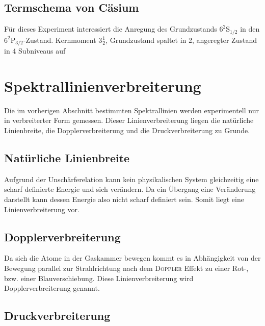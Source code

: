 \documentclass[../bericht.tex]{subfiles}
\begin{document}
      \subsection{Termschema von Cäsium}
      \label{subsec:termschema-caesium}

        Für dieses Experiment interessiert die Anregung des Grundzustands $6^2\mathrm{S}_{1/2}$ in den $6^2\mathrm{P}_{3/2}$-Zustand.
        Kernmoment $3 \frac{1}{2}$, Grundzustand spaltet in 2, angeregter Zustand in 4 Subniveaus auf




    \section{Spektrallinienverbreiterung}
    \label{sec:linienverbreiterung}

      Die im vorherigen Abschnitt bestimmten Spektrallinien werden experimentell nur in verbreiterter Form gemessen. Dieser Linienverbreiterung liegen die natürliche Linienbreite, die Dopplerverbreiterung und die Druckverbreiterung zu Grunde.

      \subsection{Natürliche Linienbreite}
      \label{subsec:natuerliche-linienbreite}

        Aufgrund der Unschärferelation kann kein physikalischen System gleichzeitig eine scharf definierte Energie und sich verändern. Da ein Übergang eine Veränderung darstellt kann dessen Energie also nicht scharf definiert sein. Somit liegt eine Linienverbreiterung vor.


      \subsection{Dopplerverbreiterung}
      \label{subsec:dopplerverbreiterung}

        Da sich die Atome in der Gaskammer bewegen kommt es in Abhängigkeit von der Bewegung parallel zur Strahlrichtung nach dem \textsc{Doppler} Effekt zu einer Rot-, bzw. einer Blauverschiebung. Diese Linienverbreiterung wird Dopplerverbreiterung genannt.


      \subsection{Druckverbreiterung}
      \label{subsec:druckverbreiterung}
\end{document}
